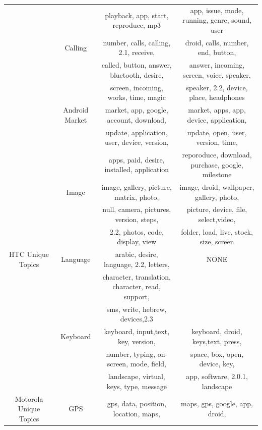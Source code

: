 \documentclass[10pt, conference, compsocconf]{IEEEtran}
\begin{document}
\begin{table}[!htb]
\begin{tabular}{|c||c||c||c|}
&&playback, app, start, reproduce, mp3 &app, issue, mode, running, genre, sound, user\\ \cline{2-4}
           
&Calling& number, calls, calling, 2.1, receive, &droid, calls, number, end, button, \\
&& called, button, answer, bluetooth, desire,  &answer, incoming, screen, voice, speaker, \\ 

&& screen, incoming, works, time, magic & speaker, 2.2, device, place, headphones\\ \cline{2-4}
           
&Android Market& market, app, google, account, download, &market, apps, app, device, application,  \\

&&update, application, user, device, version, &update, open, user, version, time, \\ 
           
&&apps, paid, desire, installed, application & reporoduce, download, purchase, google, milestone\\ \cline{2-4}   
        
&Image & image, gallery, picture, matrix, photo,  &image, droid, wallpaper, gallery, photo,\\
&&null, camera, pictures, version, steps,& picture, device,	file, select,video,\\

&&2.2, photos, code, display, view & folder, load, live, stock, size, screen\\

\hline
HTC Unique Topics & Language 
&arabic, desire, language, 2.2, letters, & NONE\\

&&character, translation, character, read, support,& \\

&&sms, write, hebrew, devices,2.3 & \\ \cline{2-4}


& Keyboard &keyboard, input,text, key, version,& keyboard, droid, keys,text, press, \\
&& number, typing, on-screen, mode, field, & space, box, open, device, key, \\
&&landscape, virtual, keys, type, message & app, software, 2.0.1, landscape \\
           
           
\hline
Motorola Unique Topics 
& GPS &gps, data, position, location, maps, & maps, gps, google, app, droid, \\


\end{tabular}
\end{table}
\end{document}
